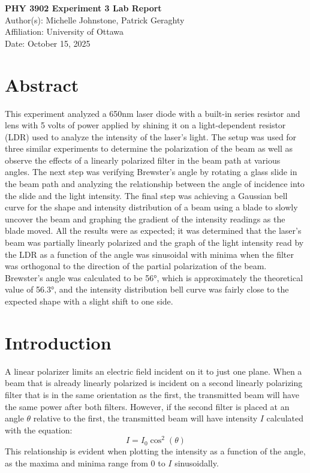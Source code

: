 \documentclass[12pt,a4paper]{article}
\begin{document}
\begin{center}
    {\LARGE\bfseries PHY 3902 Experiment 3 Lab Report}\\[1.5em]
    {\large Author(s): Michelle Johnstone, Patrick Geraghty}\\
    {\large Affiliation: University of Ottawa}\\
    {\large Date: October 15, 2025}
\end{center}

\section*{Abstract}
This experiment analyzed a 650nm laser diode with a built-in series resistor and lens with 5 volts of power applied by shining it on a light-dependent resistor (LDR) used to analyze the intensity of the laser's light. The setup was used for three similar experiments to determine the polarization of the beam as well as observe the effects of a linearly polarized filter in the beam path at various angles. The next step was verifying Brewster's angle by rotating a glass slide in the beam path and analyzing the relationship between the angle of incidence into the slide and the light intensity. The final step was achieving a Gaussian bell curve for the shape and intensity distribution of a beam using a blade to slowly uncover the beam and graphing the gradient of the intensity readings as the blade moved. All the results were as expected; it was determined that the laser's beam was partially linearly polarized and the graph of the light intensity read by the LDR as a function of the angle was sinusoidal with minima when the filter was orthogonal to the direction of the partial polarization of the beam. Brewster's angle was calculated to be 56°, which is approximately the theoretical value of 56.3°, and the intensity distribution bell curve was fairly close to the expected shape with a slight shift to one side.

\section{Introduction}
A linear polarizer limits an electric field incident on it to just one plane. When a beam that is already linearly polarized is incident on a second linearly polarizing filter that is in the same orientation as the first, the transmitted beam will have the same power after both filters. However, if the second filter is placed at an angle $\theta$ relative to the first, the transmitted beam will have intensity $I$ calculated with the equation:
\begin{equation}
I = I_0 \cos^2(\theta)
\end{equation}
This relationship is evident when plotting the intensity as a function of the angle, as the maxima and minima range from 0 to $I$ sinusoidally.
\end{document}
